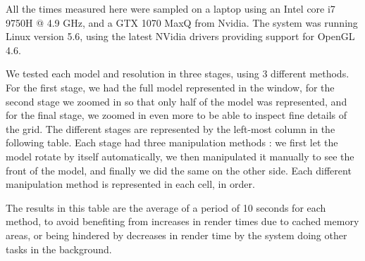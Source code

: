 All the times measured here were sampled on a laptop using an Intel core i7 9750H @ 4.9 GHz, and a GTX 1070 MaxQ from Nvidia. The system was running Linux version 5.6, using the latest NVidia drivers providing support for OpenGL 4.6.

We tested each model and resolution in three stages, using 3 different methods. For the first stage, we had the full model represented in the window, for the second stage we zoomed in so that only half of the model was represented, and for the final stage, we zoomed in even more to be able to inspect fine details of the grid. The different stages are represented by the left-most column in the following table. Each stage had three manipulation methods : we first let the model rotate by itself automatically, we then manipulated it manually to see the front
of the model, and finally we did the same on the other side. Each different manipulation method is represented in each cell, in order.

The results in this table are the average of a period of 10 seconds for each method, to avoid benefiting from increases in render times due to cached memory areas, or being hindered by decreases in render time by the system doing other tasks in the background.

